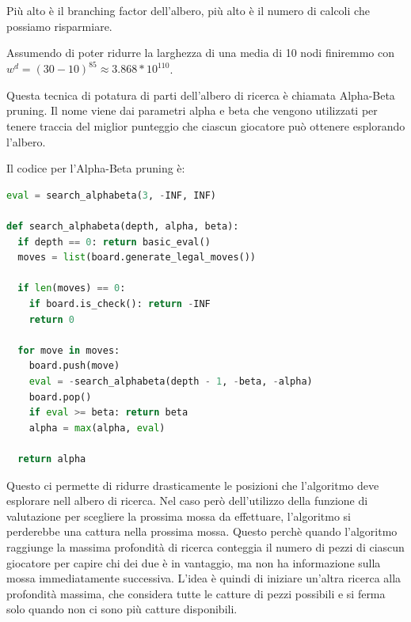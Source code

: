 \documentclass{article}
\begin{document}
Più alto è il branching factor dell'albero, più alto è il numero di calcoli che possiamo risparmiare.

Assumendo di poter ridurre la larghezza di una media di 10 nodi finiremmo con $w^d = (30-10)^{85} \approx 3.868 * 10^{110}$.

Questa tecnica di potatura di parti dell'albero di ricerca è chiamata Alpha-Beta pruning.
Il nome viene dai parametri alpha e beta che vengono utilizzati per tenere traccia del miglior punteggio che ciascun giocatore può ottenere esplorando l'albero.

Il codice per l'Alpha-Beta pruning è:

\begin{lstlisting}[language=python]
eval = search_alphabeta(3, -INF, INF)

def search_alphabeta(depth, alpha, beta):
  if depth == 0: return basic_eval()
  moves = list(board.generate_legal_moves())

  if len(moves) == 0:
    if board.is_check(): return -INF
    return 0
    
  for move in moves:
    board.push(move)
    eval = -search_alphabeta(depth - 1, -beta, -alpha)
    board.pop()
    if eval >= beta: return beta
    alpha = max(alpha, eval)

  return alpha
\end{lstlisting}

Questo ci permette di ridurre drasticamente le posizioni che l'algoritmo deve esplorare nell albero di ricerca.
Nel caso però dell'utilizzo della funzione di valutazione per scegliere la prossima mossa da effettuare, l'algoritmo si perderebbe una cattura nella prossima mossa.
Questo perchè quando l'algoritmo raggiunge la massima profondità di ricerca conteggia il numero di pezzi di ciascun giocatore per capire chi dei due è in vantaggio, ma non ha informazione sulla mossa immediatamente successiva.
L'idea è quindi di iniziare un'altra ricerca alla profondità massima, che considera tutte le catture di pezzi possibili e si ferma solo quando non ci sono più catture disponibili.



\end{document}
